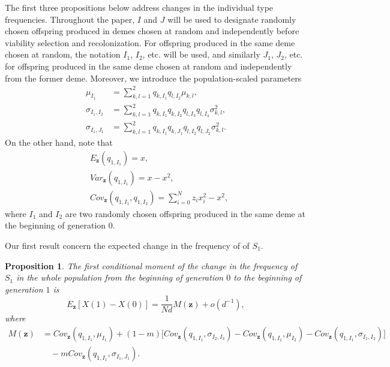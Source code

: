 \documentclass[11pt]{article}
\newtheorem{Proposition}{Proposition}
\begin{document}
The first three propositions below address changes in the individual type frequencies. Throughout the paper, $I$ and $J$ will be used to designate randomly chosen offspring produced in demes chosen at random and independently before viability selection and recolonization. For offspring produced in the same deme chosen at random, the notation $I_1$, $I_2$, etc. will be used, and similarly $J_1$, $J_2$, etc. for offspring produced in the same deme chosen at random and independently from the former deme. 
Moreover, we introduce the population-scaled parameters 
\begin{subequations}\label{sec2-eq4}
\begin{align}
\mu_{I_1}&=\sum_{k,l=1}^{2}q_{k,I_1}q_{l,I_2}\mu_{k,l},\\
\sigma_{I_1,I_2}&=\sum_{k,l=1}^{2}q_{k,I_1}q_{k,I_2}q_{l,I_3}q_{l,I_4}\sigma^2_{k,l},\\
\sigma_{I_1,J_1}&=\sum_{k,l=1}^{2}q_{k,I_1}q_{k,J_1}q_{l,I_2}q_{l,J_2}\sigma^2_{k,l}.
\end{align}
\end{subequations}
On the other hand, note that
\begin{subequations}\label{sec1-eq8}
\begin{align}
&E_{\mathbf{z}}\left( q_{1,I_1}\right)=x,\\
&Var_{\mathbf{z}}(q_{1,I_1})=x-x^2,\\
&Cov_{\mathbf{z}}\left(q_{1,I_1},q_{1,I_2}\right)=\sum_{i=0}^{N}z_ix^2_i-x^2,
\end{align} 
\end{subequations}
where $I_1$ and $I_2$ are two randomly chosen offspring produced in the same deme at the beginning of generation $0$.

Our first result concern the expected change in the frequency of of $S_1$.

\begin{Proposition}\label{Proposition1}
The first conditional moment of the change in the frequency of $S_1$ in the whole population from the beginning of generation $0$ to the beginning of generation $1$ is 
\begin{equation}\label{sec2-eq5}
E_{\mathbf{z}}\left[X(1)-X(0)\right]=\frac{1}{Nd}M(\mathbf{z})+o\left(d^{-1}\right),
\end{equation}
where
\begin{align}\label{sec2-eq6}
M(\mathbf{z})&=Cov_{\mathbf{z}}(q_{1,I_1},\mu_{I_1})+(1-m)\Big[Cov_{\mathbf{z}}(q_{1,I_1},\sigma_{I_2,I_3})-Cov_{\mathbf{z}}(q_{1,I_1},\mu_{I_2})-Cov_{\mathbf{z}}(q_{1,I_1},\sigma_{I_1,I_2})\Big]\nonumber\\
&\quad-mCov_{\mathbf{z}}(q_{1,I_1},\sigma_{I_1,J_1}).
\end{align}
\end{Proposition}
\end{document}

